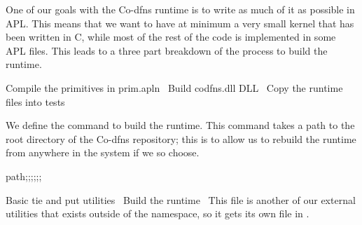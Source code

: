 \documentclass{article}%
\begin{document}
One of our goals with the Co-dfns runtime is to write as much of it
as possible in APL.
This means that we want to have at minimum a very small kernel that
has been written in C,
while most of the rest of the code is implemented in some APL files.
This leads to a three part breakdown of the process to
build the runtime.

\nwenddocs{}\endmoddef\nwstartdeflinemarkup{}\nwenddeflinemarkup
\LA{}Compile the primitives in \code{}prim.apln\edoc{}~{\nwtagstyle{}}\RA{}
\LA{}Build \code{}codfns.dll\edoc{} DLL~{\nwtagstyle{}}\RA{}
\LA{}Copy the runtime files into \code{}tests{\nwbackslash}\edoc{}~{\nwtagstyle{}}\RA{}
\nwendcode{}\nwdocspar

We define the command {\Tt{}\nwendquote} to build the runtime.
This command takes a path to the root directory of the Co-dfns
repository; this is to allow us to rebuild the runtime from anywhere
in the system if we so choose.

\nwenddocs{}\endmoddef\nwstartdeflinemarkup\nwenddeflinemarkup
{} path;;;;;;

\LA{}Basic \code{}tie\edoc{} and \code{}put\edoc{} utilities~{\nwtagstyle{}}\RA{}
\LA{}Build the runtime~{\nwtagstyle{}}\RA{}
\eatline
\nwnotused{[[MK∆RTM]]}\nwendcode{}\nwdocspar
This file is another of our external utilities that exists outside 
of the {\Tt{}\nwendquote} namespace, so it gets its own file in {\Tt{}\nwendquote}.
\end{document}
